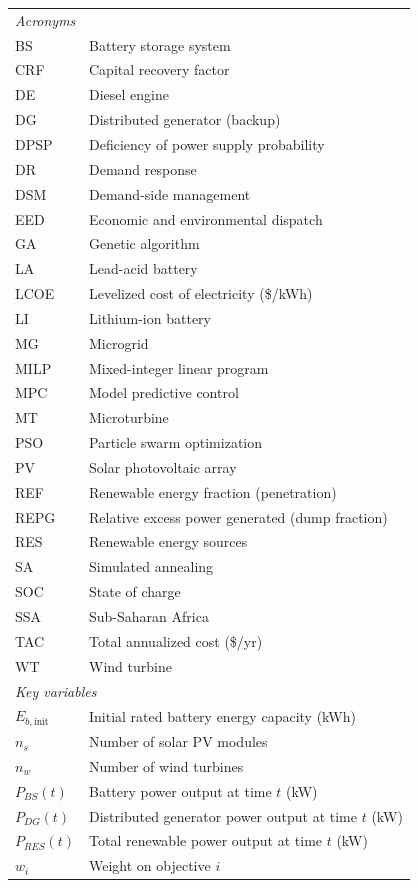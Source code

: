 \documentclass[final,3p,times]{elsarticle}
\begin{document}
\begin{tabular}{ll}
\multicolumn{2}{l}{\textit{Acronyms}} \\
BS  & Battery storage system \\
CRF & Capital recovery factor \\
DE  & Diesel engine \\
DG  & Distributed generator (backup) \\
DPSP & Deficiency of power supply probability \\
DR  & Demand response \\
DSM & Demand-side management \\
EED & Economic and environmental dispatch \\
GA  & Genetic algorithm \\
LA  & Lead-acid battery \\
LCOE & Levelized cost of electricity (\$/kWh) \\
LI  & Lithium-ion battery \\
MG  & Microgrid \\
MILP & Mixed-integer linear program \\
MPC & Model predictive control \\
MT  & Microturbine \\
PSO & Particle swarm optimization \\
PV  & Solar photovoltaic array \\
REF & Renewable energy fraction (penetration) \\
REPG & Relative excess power generated (dump fraction) \\
RES & Renewable energy sources \\
SA  & Simulated annealing \\
SOC & State of charge \\
SSA & Sub-Saharan Africa \\
TAC & Total annualized cost (\$/yr) \\
WT  & Wind turbine \\[6pt]
\multicolumn{2}{l}{\textit{Key variables}} \\
$E_{b,\text{init}}$ & Initial rated battery energy capacity (kWh) \\
$n_s$ & Number of solar PV modules \\
$n_w$ & Number of wind turbines \\
$P_{BS}(t)$ & Battery power output at time $t$ (kW) \\
$P_{DG}(t)$ & Distributed generator power output at time $t$ (kW) \\
$P_{RES}(t)$ & Total renewable power output at time $t$ (kW) \\
$w_i$ & Weight on objective $i$ \\
\end{tabular}
\end{document}
